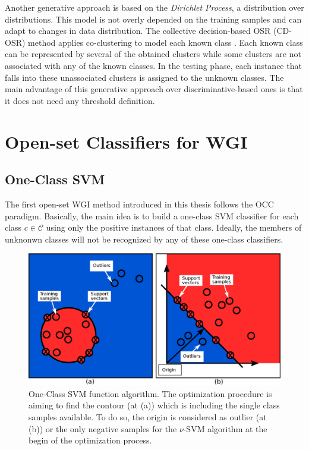 Another generative approach is based on the \textit{Dirichlet Process}, a distribution over distributions. This model is not overly depended on the training samples and can adapt to changes in data distribution. The collective decision-based OSR (CD-OSR) method applies co-clustering to model each known class \parencite{geng2018collective}. Each known class can be represented by several of the obtained clusters while some clusters are not associated with any of the known classes. In the testing phase, each instance that falls into these unassociated clusters is assigned to the unknown classes. The main advantage of this generative approach over discriminative-based ones is that it does not need any threshold definition.

\section{Open-set Classifiers for WGI}
\label{chap:openset:sec:Open_set_classifiers_for_WGI}

\subsection{One-Class SVM}\label{chap:openset:sec:OCSVM_description}

The first open-set WGI method introduced in this thesis follows the OCC paradigm. Basically, the main idea is to build a one-class SVM classifier for each class $c \in \mathcal{C}$ using only the positive instances of that class. Ideally, the members of unknonwn classes will not be recognized by any of these one-class classifiers.

\begin{figure}[t]
	\begin{center}
    	\includegraphics[scale=0.70]{Figures/OCSVM_diagrams.eps}
		\caption{One-Class SVM function algorithm. The optimization procedure is aiming to find the contour (at (a)) which is including the single class samples available. To do so, the origin is considered as outlier (at (b)) or the only negative samples for the $\nu$-SVM algorithm at the begin of the optimization process.}
		\label{chap:openset:fig:ocsvm_single_class}
	\end{center}
\end{figure}

